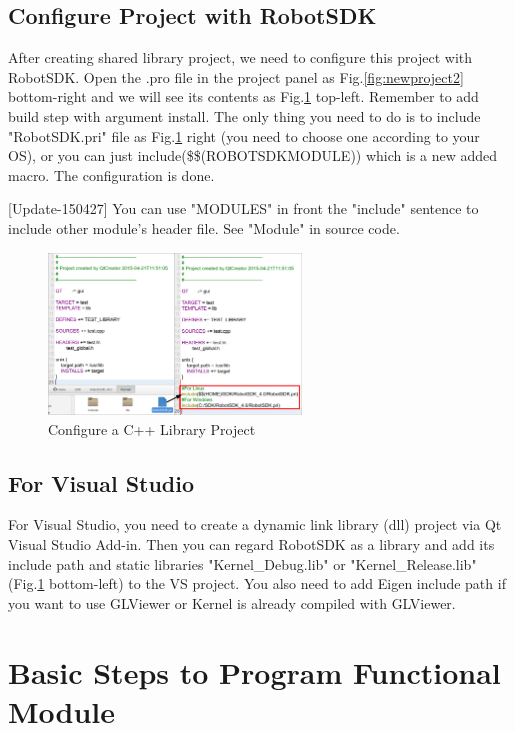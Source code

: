 \documentclass[a4paper,10pt]{book}
\begin{document}
\subsection{Configure Project with RobotSDK}

After creating shared library project, we need to configure this project with RobotSDK. Open the .pro file in the project panel as Fig.\ref{fig:newproject2} bottom-right and we will see its contents as Fig.\ref{fig:configproject1} top-left. Remember to add build step with argument install. The only thing you need to do is to include "RobotSDK.pri" file as Fig.\ref{fig:configproject1} right (you need to choose one according to your OS), or you can just include(\$\$(ROBOTSDKMODULE)) which is a new added macro. The configuration is done.

[Update-150427] You can use "MODULES" in front the "include" sentence to include other module's header file. See "Module" in source code. 

\begin{figure}
 \centering
 \includegraphics[width=0.6\textwidth]{img/configproject1.eps}
 \caption{Configure a C++ Library Project}
 \label{fig:configproject1}
\end{figure}

\subsection{For Visual Studio}

For Visual Studio, you need to create a dynamic link library (dll) project via Qt Visual Studio Add-in. Then you can regard RobotSDK as a library and add its include path and static libraries "Kernel\_Debug.lib" or "Kernel\_Release.lib" (Fig.\ref{fig:configproject1} bottom-left) to the VS project. You also need to add Eigen include path if you want to use GLViewer or Kernel is already compiled with GLViewer.

\section{Basic Steps to Program Functional Module}
\end{document}
